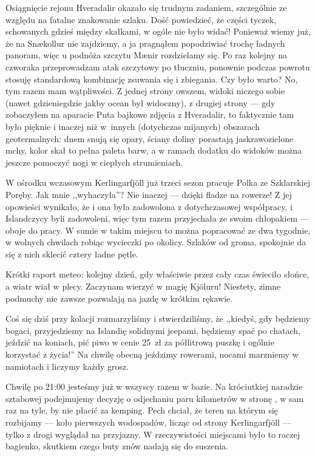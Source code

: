 Osiągnięcie rejonu Hveradalir okazało się trudnym zadaniem, szczególnie ze względu na fatalne znakowanie szlaku. Dość powiedzieć, że części tyczek, schowanych gdzieś między skałkami, w ogóle nie było widać! Ponieważ wiemy już, że na Snækollur nie zajdziemy, a ja pragnąłem popodziwiać trochę ładnych panoram, więc u podnóża szczytu Mænir rozdzielamy się. Po raz kolejny na czworaka przeprowadzam atak szczytowy po tłuczniu, ponownie podczas powrotu stosuję standardową kombinację zsuwania się i zbiegania. Czy było warto? No, tym razem mam wątpliwości. Z jednej strony owszem, widoki niczego sobie (nawet gdzieniegdzie jakby ocean był widoczny), z drugiej strony --- gdy zobaczyłem na aparacie Puta bajkowe zdjęcia z Hveradalir, to faktycznie tam było pięknie i inaczej niż w~innych (dotychczas mijanych) obszarach geotermalnych: dnem snują się opary, ściany doliny porastają jaskrawozielone mchy, kolor skał to pełna paleta barw, a w ramach dodatku do widoków można jeszcze pomoczyć nogi w ciepłych strumieniach.

W ośrodku wczasowym Kerlingarfjöll już trzeci sezon pracuje Polka ze Szklarskiej Poręby. Jak mnie ,,wyhaczyła''? Nie inaczej --- dzięki fladze na rowerze! Z jej opowieści wynikało, że i ona była zadowolona z dotychczasowej współpracy, i Islandczycy byli zadowoleni, więc tym razem przyjechała ze swoim chłopakiem --- oboje do pracy. W sumie w takim miejscu to można popracować ze dwa tygodnie, w wolnych chwilach robiąc wycieczki po okolicy. Szlaków od groma, spokojnie da się z nich sklecić cztery ładne pętle.


Krótki raport meteo: kolejny dzień, gdy właściwie przez cały czas świeciło słońce, a wiatr wiał w plecy. Zaczynam wierzyć w magię Kjöluru! Niestety, zimne podmuchy nie zawsze pozwalają na jazdę w krótkim rękawie.

Coś się dziś przy kolacji rozmarzyliśmy i stwierdziliśmy, że ,,kiedyś, gdy będziemy bogaci, przyjedziemy na Islandię solidnymi jeepami, będziemy spać po chatach, jeździć na koniach, pić piwo w cenie 25~zł za półlitrową puszkę i ogólnie korzystać z życia!'' Na chwilę obecną jeździmy rowerami, nocami marzniemy w namiotach i liczymy każdy grosz.

Chwilę po 21:00 jesteśmy już w wszyscy razem w bazie. Na króciutkiej naradzie sztabowej podejmujemy decyzję o odjechaniu paru kilometrów w stronę , w sam raz na tyle, by nie płacić za kemping. Pech chciał, że teren na którym się rozbijamy --- koło pierwszych wodospadów, licząc od strony Kerlingarfjöll --- tylko z drogi wyglądał na przyjazny. W rzeczywistości miejscami było to raczej bagienko, skutkiem czego buty znów nadają się do suszenia.

